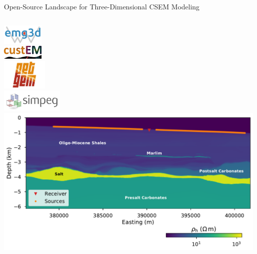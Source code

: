 \documentclass[xcolor=svgnames, aspectratio=169]{beamer}
\begin{document}

\begin{frame}[c]%
  {Open-Source Landscape for Three-Dimensional CSEM Modeling}
  \vspace{.3cm}
  \begin{columns}[c]
      \centering
      \includegraphics[width=2.0cm]{Logo-emg3d}\\[.5cm]
      \includegraphics[width=2.0cm]{Logo-custEM}\\[.5cm]
      \includegraphics[width=2.2cm]{Logo-PETGEM}\\[.5cm]
      \includegraphics[width=3.0cm]{Logo-SimPEG2}
      ~\\\vspace{.4cm}
      \includegraphics[width=.9\textwidth]{model-marlim}\\[.5cm]
\end{columns}
\end{frame}
\end{document}
